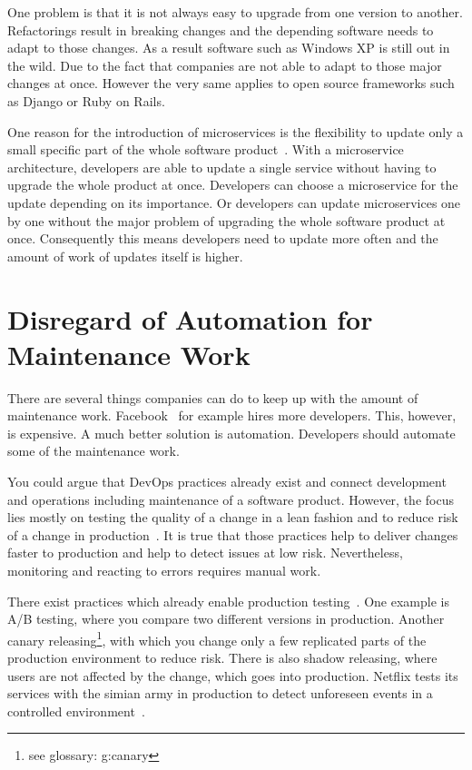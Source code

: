One problem is that it is not always easy to upgrade from one version to
another. Refactorings result in breaking changes and the depending software needs to adapt
to those changes. As a result software such as Windows XP is still out in the wild. Due to
the fact that companies are not able to adapt to those major changes at once. However the
very same applies to open source frameworks such as Django or Ruby on Rails.

One reason for the introduction of microservices is the flexibility to update only a small
specific part of the whole software product~\cite{microservices_fowler}. With a
microservice architecture, developers are able to update a single service without having
to upgrade the whole product at once. Developers can choose a microservice for the update
depending on its importance. Or developers can update microservices one by one without the
major problem of upgrading the whole software product at once. Consequently this means
developers need to update more often and the amount of work of updates itself is higher.

\section{Disregard of Automation for Maintenance Work}

There are several things companies can do to keep up with the amount of maintenance
work. Facebook~\cite{dev_at_fb} for example hires more developers. This, however, is
expensive. A much better solution is automation. Developers should automate some of the
maintenance work.

You could argue that DevOps practices already exist and connect development and operations
including maintenance of a software product. However, the focus lies mostly on testing the
quality of a change in a lean fashion and to reduce risk of a change in
production~\cite{devops_definition}. It is true that those practices help to deliver
changes faster to production and help to detect issues at low risk. Nevertheless,
monitoring and reacting to errors requires manual work.

There exist practices which already enable production testing~\cite{dev_at_fb}. One
example is A/B testing, where you compare two different versions in production. Another
canary releasing\footnote{see glossary: \gls{g:canary}}, with which you change only a few
replicated parts of the production environment to reduce risk. There is also shadow
releasing, where users are not affected by the change, which goes into production. Netflix
tests its services with the simian army in production to detect unforeseen events in a
controlled environment~\cite{antifragile_org}.

